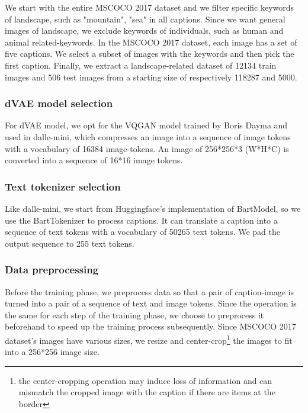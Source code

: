 \documentclass{article}
\begin{document}
We start with the entire MSCOCO 2017 dataset and we filter specific keywords of landscape, such as "mountain", "sea" in all captions. Since we want general images of landscape, we exclude keywords of individuals, such as human and animal related-keywords. In the MSCOCO 2017 dataset, each image has a set of five captions. We select a subset of images with the keywords and then pick the first caption. Finally, we extract a landscape-related dataset of 12134 train images and 506 test images from a starting size of respectively 118287 and 5000.

\subsubsection{dVAE model selection}
For dVAE model, we opt for the VQGAN model trained by Boris Dayma and used in dalle-mini, which compresses an image into a sequence of image tokens with a vocabulary of 16384 image-tokens. An image of 256*256*3 (W*H*C) is converted into a sequence of 16*16 image tokens.

\subsubsection{Text tokenizer selection}
Like dalle-mini, we start from Huggingface's implementation of BartModel, so we use the BartTokenizer to process captions. It can translate a caption into a sequence of text tokens with a vocabulary of 50265 text tokens. We pad the output sequence to 255 text tokens.

\subsubsection{Data preprocessing}
Before the training phase, we preprocess data so that a pair of caption-image is turned into a pair of a sequence of text and image tokens. Since the operation is the same for each step of the training phase, we choose to preprocess it beforehand to speed up the training process subsequently. Since MSCOCO 2017 dataset's images have various sizes, we resize and center-crop\footnote{the center-cropping operation may induce loss of information and can mismatch the cropped image with the caption if there are items at the border} the images to fit into a 256*256 image size.
\end{document}
